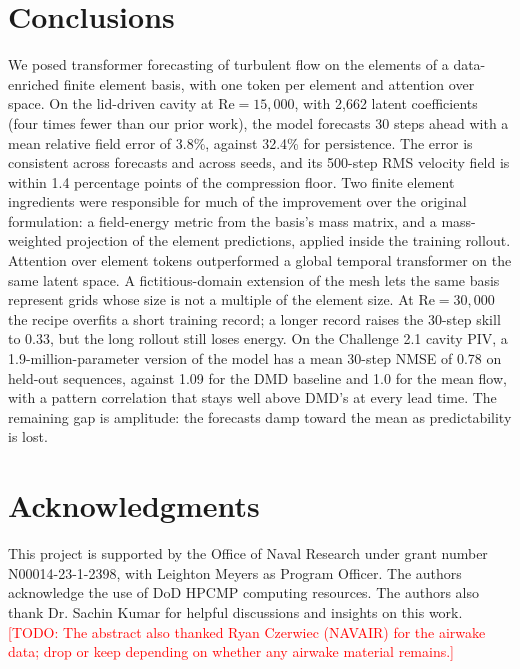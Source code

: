 \documentclass[conf]{new-aiaa}
\newcommand{\todo}[1]{\textcolor{red}{[TODO: #1]}}
\newcommand{\Rey}{\mathrm{Re}}
\begin{document}
\section{Conclusions}
\label{sec:conclusions}
We posed transformer forecasting of turbulent flow on the elements of a data-enriched finite element basis, with one token per element and attention over space. On the lid-driven cavity at $\Rey=15{,}000$, with 2,662 latent coefficients (four times fewer than our prior work), the model forecasts 30 steps ahead with a mean relative field error of 3.8\%, against 32.4\% for persistence. The error is consistent across forecasts and across seeds, and its 500-step RMS velocity field is within 1.4 percentage points of the compression floor. Two finite element ingredients were responsible for much of the improvement over the original formulation: a field-energy metric from the basis's mass matrix, and a mass-weighted projection of the element predictions, applied inside the training rollout. Attention over element tokens outperformed a global temporal transformer on the same latent space. A fictitious-domain extension of the mesh lets the same basis represent grids whose size is not a multiple of the element size. At $\Rey=30{,}000$ the recipe overfits a short training record; a longer record raises the 30-step skill to 0.33, but the long rollout still loses energy. On the Challenge 2.1 cavity PIV, a 1.9-million-parameter version of the model has a mean 30-step NMSE of 0.78 on held-out sequences, against 1.09 for the DMD baseline and 1.0 for the mean flow, with a pattern correlation that stays well above DMD's at every lead time. The remaining gap is amplitude: the forecasts damp toward the mean as predictability is lost.

\section*{Acknowledgments}
This project is supported by the Office of Naval Research under grant number N00014-23-1-2398, with Leighton Meyers as Program Officer. The authors acknowledge the use of DoD HPCMP computing resources. The authors also thank Dr. Sachin Kumar for helpful discussions and insights on this work. \todo{The abstract also thanked Ryan Czerwiec (NAVAIR) for the airwake data; drop or keep depending on whether any airwake material remains.}


\end{document}

